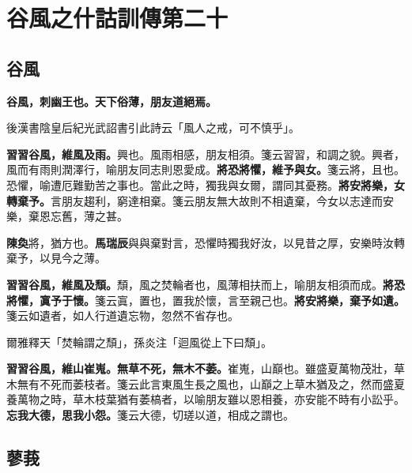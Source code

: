 \chapter{谷風之什詁訓傳第二十}

\section{谷風}


\textbf{谷風，刺幽王也。天下俗薄，朋友道絕焉。}

\begin{quoting}後漢書陰皇后紀光武詔書引此詩云「風人之戒，可不慎乎」。\end{quoting}

\textbf{習習谷風，維風及雨。}{\footnotesize 興也。風雨相感，朋友相須。箋云習習，和調之貌。興者，風而有雨則潤澤行，喻朋友同志則恩愛成。}\textbf{將恐將懼，維予與女。}{\footnotesize 箋云將，且也。恐懼，喻遭厄難勤苦之事也。當此之時，獨我與女爾，謂同其憂務。}\textbf{將安將樂，女轉棄予。}{\footnotesize 言朋友趨利，窮達相棄。箋云朋友無大故則不相遺棄，今女以志達而安樂，棄恩忘舊，薄之甚。}

\begin{quoting}\textbf{陳奐}將，猶方也。\textbf{馬瑞辰}與與棄對言，恐懼時獨我好汝，以見昔之厚，安樂時汝轉棄予，以見今之薄。\end{quoting}

\textbf{習習谷風，維風及頹。}{\footnotesize 頹，風之焚輪者也，風薄相扶而上，喻朋友相須而成。}\textbf{將恐將懼，寘予于懷。}{\footnotesize 箋云寘，置也，置我於懷，言至親己也。}\textbf{將安將樂，棄予如遺。}{\footnotesize 箋云如遺者，如人行道遺忘物，忽然不省存也。}

\begin{quoting}爾雅釋天「焚輪謂之頹」，孫炎注「迴風從上下曰頹」。\end{quoting}

\textbf{習習谷風，維山崔嵬。無草不死，無木不萎。}{\footnotesize 崔嵬，山巔也。雖盛夏萬物茂壯，草木無有不死而萎枝者。箋云此言東風生長之風也，山巔之上草木猶及之，然而盛夏養萬物之時，草木枝葉猶有萎槁者，以喻朋友雖以恩相養，亦安能不時有小訟乎。}\textbf{忘我大德，思我小怨。}{\footnotesize 箋云大德，切瑳以道，相成之謂也。}

\section{蓼莪}


